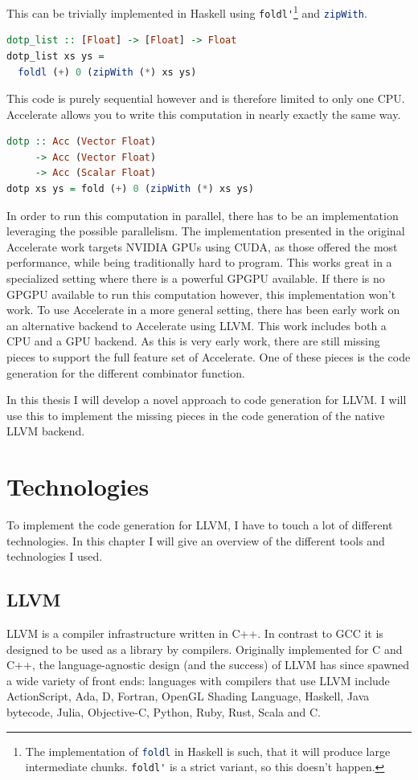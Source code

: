 \documentclass[a4paper,bibliography=totocnumbered,parskip,headsepline]{scrbook}
\begin{document}
This can be trivially implemented in Haskell using \lstinline[language=haskell]!foldl'!\footnote{The implementation of \lstinline[language=haskell]!foldl! in Haskell is such, that it will produce large intermediate chunks. \lstinline[language=haskell]!foldl'! is a strict variant, so this doesn't happen.} and \lstinline[language=haskell]!zipWith!.
\begin{lstlisting}[language=haskell]
dotp_list :: [Float] -> [Float] -> Float
dotp_list xs ys =
  foldl (+) 0 (zipWith (*) xs ys)
\end{lstlisting}
This code is purely sequential however and is therefore limited to only one CPU.
Accelerate allows you to write this computation in nearly exactly the same way.
\begin{lstlisting}[language=haskell]
dotp :: Acc (Vector Float)
     -> Acc (Vector Float)
     -> Acc (Scalar Float)
dotp xs ys = fold (+) 0 (zipWith (*) xs ys)
\end{lstlisting}
In order to run this computation in parallel, there has to be an implementation leveraging the possible parallelism.
The implementation presented in the original Accelerate work targets NVIDIA GPUs using CUDA, as those offered the most performance, while being traditionally hard to program.
This works great in a specialized setting where there is a powerful GPGPU available.
If there is no GPGPU available to run this computation however, this implementation won't work.
To use Accelerate in a more general setting, there has been early work on an alternative backend to Accelerate using LLVM.\cite{trevor2014llvm}
This work includes both a CPU and a GPU backend.
As this is very early work, there are still missing pieces to support the full feature set of Accelerate.
One of these pieces is the code generation for the different combinator function.

In this thesis I will develop a novel approach to code generation for LLVM.
I will use this to implement the missing pieces in the code generation of the native LLVM backend.


\chapter{Technologies}
To implement the code generation for LLVM, I have to touch a lot of different technologies.
In this chapter I will give an overview of the different tools and technologies I used.

\section{LLVM}
LLVM\cite{lattner2002llvm} is a compiler infrastructure written in C++.
In contrast to GCC it is designed to be used as a library by compilers.
Originally implemented for C and C++, the language-agnostic design (and the success) of LLVM has since spawned a wide variety of front ends: languages with compilers that use LLVM include ActionScript, Ada, D, Fortran, OpenGL Shading Language, Haskell, Java bytecode, Julia, Objective-C, Python, Ruby, Rust, Scala and C.
\end{document}
